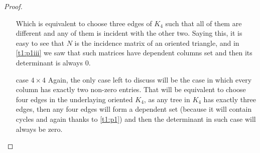 \begin{proof}
\begin{itemize}
            Which is equivalent to choose three edges of $K_4$ such that all of them are different and any of them is incident with the other two.
            Saying this, it is easy to see that $N$ is the incidence matrix of an oriented triangle, and in \ref{t1:p1iii} we saw that such matrices have
            dependent columns set and then its determinant is always $0$.
            
        \item [case $4 \times 4$]
            Again, the only case left to discuss will be the case in which every column has exactly two non-zero entries. That will be equivalent
            to choose four edges in the underlaying oriented $K_4$, as any tree in $K_4$ has exactly three edges, then any four edges will form
            a dependent set (because it will contain cycles and again thanks to \ref{t1:p1}) and then the determinant in such case will always be zero.
    \end{itemize}
\end{proof}